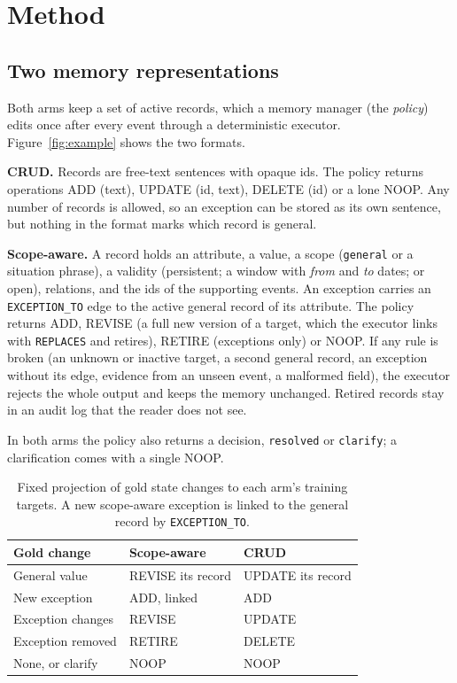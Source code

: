 \documentclass[11pt]{article}
\begin{document}
\section{Method}\label{sec:method}

\subsection{Two memory representations}
Both arms keep a set of active records, which a memory manager (the \emph{policy}) edits once after every event through a deterministic executor. Figure~\ref{fig:example} shows the two formats.

\textbf{CRUD.} Records are free-text sentences with opaque ids. The policy returns operations ADD (text), UPDATE (id, text), DELETE (id) or a lone NOOP. Any number of records is allowed, so an exception can be stored as its own sentence, but nothing in the format marks which record is general.

\textbf{Scope-aware.} A record holds an attribute, a value, a scope (\texttt{general} or a situation phrase), a validity (persistent; a window with \emph{from} and \emph{to} dates; or open), relations, and the ids of the supporting events. An exception carries an \texttt{EXCEPTION\_TO} edge to the active general record of its attribute. The policy returns ADD, REVISE (a full new version of a target, which the executor links with \texttt{REPLACES} and retires), RETIRE (exceptions only) or NOOP. If any rule is broken (an unknown or inactive target, a second general record, an exception without its edge, evidence from an unseen event, a malformed field), the executor rejects the whole output and keeps the memory unchanged. Retired records stay in an audit log that the reader does not see.

In both arms the policy also returns a decision, \texttt{resolved} or \texttt{clarify}; a clarification comes with a single NOOP.

\begin{table}[t]
\centering\footnotesize
\setlength{\tabcolsep}{3pt}
\begin{tabular}{@{}lll@{}}
\toprule
Gold change & Scope-aware & CRUD \\
\midrule
General value & REVISE its record & UPDATE its record \\
New exception & ADD, linked & ADD \\
Exception changes & REVISE & UPDATE \\
Exception removed & RETIRE & DELETE \\
None, or clarify & NOOP & NOOP \\
\bottomrule
\end{tabular}
\caption{Fixed projection of gold state changes to each arm's training targets. A new scope-aware exception is linked to the general record by \texttt{EXCEPTION\_TO}.}
\label{tab:ops}
\end{table}
\end{document}
